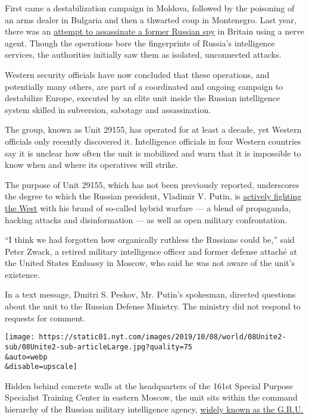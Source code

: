 First came a destabilization campaign in Moldova, followed by the
poisoning of an arms dealer in Bulgaria and then a thwarted coup in
Montenegro. Last year, there was an
\href{https://www.nytimes.com/2018/09/09/world/europe/sergei-skripal-russian-spy-poisoning.html}{attempt
to assassinate a former Russian spy} in Britain using a nerve agent.
Though the operations bore the fingerprints of Russia's intelligence
services, the authorities initially saw them as isolated, unconnected
attacks.

Western security officials have now concluded that these operations, and
potentially many others, are part of a coordinated and ongoing campaign
to destabilize Europe, executed by an elite unit inside the Russian
intelligence system skilled in subversion, sabotage and assassination.

The group, known as Unit 29155, has operated for at least a decade, yet
Western officials only recently discovered it. Intelligence officials in
four Western countries say it is unclear how often the unit is mobilized
and warn that it is impossible to know when and where its operatives
will strike.

The purpose of Unit 29155, which has not been previously reported,
underscores the degree to which the Russian president, Vladimir V.
Putin, is
\href{https://www.nytimes.com/series/russias-dark-arts}{actively
fighting the West} with his brand of so-called hybrid warfare --- a
blend of propaganda, hacking attacks and disinformation --- as well as
open military confrontation.

``I think we had forgotten how organically ruthless the Russians could
be,'' said Peter Zwack, a retired military intelligence officer and
former defense attaché at the United States Embassy in Moscow, who said
he was not aware of the unit's existence.

In a text message, Dmitri S. Peskov, Mr. Putin's spokesman, directed
questions about the unit to the Russian Defense Ministry. The ministry
did not respond to requests for comment.

\texttt{[image: https://static01.nyt.com/images/2019/10/08/world/08Unite2-sub/08Unite2-sub-articleLarge.jpg?quality=75\\\&auto=webp\\\&disable=upscale]}

Hidden behind concrete walls at the headquarters of the 161st Special
Purpose Specialist Training Center in eastern Moscow, the unit sits
within the command hierarchy of the Russian military intelligence
agency,
\href{https://www.nytimes.com/2018/07/13/world/europe/what-is-russian-gru.html}{widely
known as the G.R.U.}

